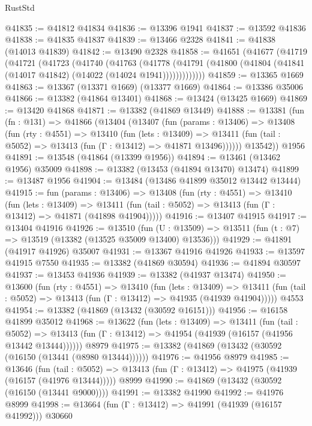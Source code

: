 \begin{lexlean}{RustStd}
\begin{coremodule}
@41835 := @41812 @41834
@41836 := @13396 @1941
@41837 := @13592 @41836
@41838 := @41835 @41837
@41839 := @13466 @2328
@41841 := @41838 (@14013 @41839)
@41842 := @13490 @2328
@41858 := @41651
    (@41677
      (@41719
        (@41721
          (@41723
            (@41740
              (@41763
                (@41778
                  (@41791 (@41800 (@41804 (@41841 (@14017 @41842) (@14022 (@14024 @1941)))))))))))))
@41859 := @13365 @1669
@41863 := @13367 (@13371 @1669) (@13377 @1669)
@41864 := @13386 @35006
@41866 := @13382 (@41864 @13401)
@41868 := @13424 (@13425 @1669)
@41869 := @13420 @41868
@41871 := @13382 (@41869 @13449)
@41888 := @13381
    (fun (fn : @131) =>
    @41866
      (@13404
        (@13407
          (fun (params : @13406) =>
          @13408
            (fun (rty : @4551) =>
            @13410
              (fun (lets : @13409) =>
              @13411 (fun (tail : @5052) => @13413 (fun (Γ : @13412) => @41871 @13496))))))
        @13542))
    @1956
@41891 := @13548 (@41864 (@13399 @1956))
@41894 := @13461 (@13462 @1956) @35009
@41898 := @13382 (@13453 (@41894 @13470) @13474)
@41899 := @13487 @1956
@41904 := @13484 (@13486 @41899 @35012 @13442 @13444)
@41915 := fun (params : @13406) =>
  @13408
    (fun (rty : @4551) =>
    @13410
      (fun (lets : @13409) =>
      @13411 (fun (tail : @5052) => @13413 (fun (Γ : @13412) => @41871 (@41898 @41904)))))
@41916 := @13407 @41915
@41917 := @13404 @41916
@41926 := @13510
    (fun (U : @13509) => @13511 (fun (t : @7) => @13519 (@13382 (@13525 @35009 @13400) @13536)))
@41929 := @41891 (@41917 @41926) @35007
@41931 := @13367 @41916 @41926
@41933 := @13597 @41915 @7550
@41935 := @13382 (@41869 @30594)
@41936 := @41894 @30597
@41937 := @13453 @41936
@41939 := @13382 (@41937 @13474)
@41950 := @13600
    (fun (rty : @4551) =>
    @13410
      (fun (lets : @13409) =>
      @13411 (fun (tail : @5052) => @13413 (fun (Γ : @13412) => @41935 (@41939 @41904)))))
    @4553
@41954 := @13382 (@41869 (@13432 (@30592 @16151)))
@41956 := @16158 @41899 @35012
@41968 := @13622
    (fun (lets : @13409) =>
    @13411
      (fun (tail : @5052) =>
      @13413 (fun (Γ : @13412) => @41954 (@41939 (@16157 (@41956 @13442 @13444))))))
    @8979
@41975 := @13382 (@41869 (@13432 (@30592 (@16150 (@13441 (@8980 @13444))))))
@41976 := @41956 @8979
@41985 := @13646
    (fun (tail : @5052) => @13413 (fun (Γ : @13412) => @41975 (@41939 (@16157 (@41976 @13444)))))
    @8999
@41990 := @41869 (@13432 (@30592 (@16150 (@13441 @9000))))
@41991 := @13382 @41990
@41992 := @41976 @8999
@41998 := @13664 (fun (Γ : @13412) => @41991 (@41939 (@16157 @41992))) @30660

\end{coremodule}
\end{lexlean}
